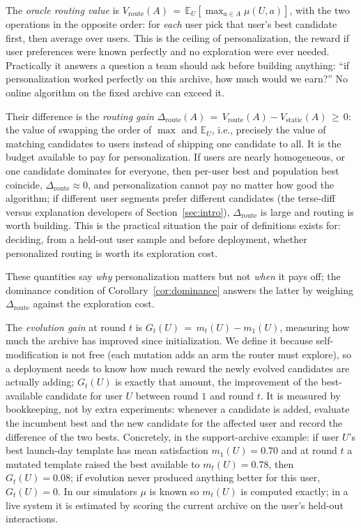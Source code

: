 \documentclass{article} %
\providecommand{\E}{\mathbb{E}}
\begin{document}
The \emph{oracle routing value} is $V_{\mathrm{route}}(A) \,=\, \E_{U}[\max_{a \in A} \mu(U,a)]$, with the two operations in the opposite order: for \emph{each} user pick that user's best candidate first, then average over users. This is the ceiling of personalization, the reward if user preferences were known perfectly and no exploration were ever needed. Practically it answers a question a team should ask before building anything: ``if personalization worked perfectly on this archive, how much would we earn?'' No online algorithm on the fixed archive can exceed it.

Their difference is the \emph{routing gain} $\Delta_{\mathrm{route}}(A) \,=\, V_{\mathrm{route}}(A) - V_{\mathrm{static}}(A) \,\geq\, 0$: the value of swapping the order of $\max$ and $\E_U$, i.e., precisely the value of matching candidates to users instead of shipping one candidate to all. It is the budget available to pay for personalization. If users are nearly homogeneous, or one candidate dominates for everyone, then per-user best and population best coincide, $\Delta_{\mathrm{route}} \approx 0$, and personalization cannot pay no matter how good the algorithm; if different user segments prefer different candidates (the terse-diff versus explanation developers of Section~\ref{sec:intro}), $\Delta_{\mathrm{route}}$ is large and routing is worth building. This is the practical situation the pair of definitions exists for: deciding, from a held-out user sample and before deployment, whether personalized routing is worth its exploration cost.

These quantities say \emph{why} personalization matters but not \emph{when} it pays off; the dominance condition of Corollary~\ref{cor:dominance} answers the latter by weighing $\Delta_{\mathrm{route}}$ against the exploration cost.

The \emph{evolution gain} at round $t$ is $G_t(U) \,=\, m_t(U) - m_1(U)$, measuring how much the archive has improved since initialization. We define it because self-modification is not free (each mutation adds an arm the router must explore), so a deployment needs to know how much reward the newly evolved candidates are actually adding; $G_t(U)$ is exactly that amount, the improvement of the best-available candidate for user $U$ between round $1$ and round $t$. It is measured by bookkeeping, not by extra experiments: whenever a candidate is added, evaluate the incumbent best and the new candidate for the affected user and record the difference of the two bests. Concretely, in the support-archive example: if user $U$'s best launch-day template has mean satisfaction $m_1(U) = 0.70$ and at round $t$ a mutated template raised the best available to $m_t(U) = 0.78$, then $G_t(U) = 0.08$; if evolution never produced anything better for this user, $G_t(U) = 0$. In our simulators $\mu$ is known so $m_t(U)$ is computed exactly; in a live system it is estimated by scoring the current archive on the user's held-out interactions.
\end{document}
